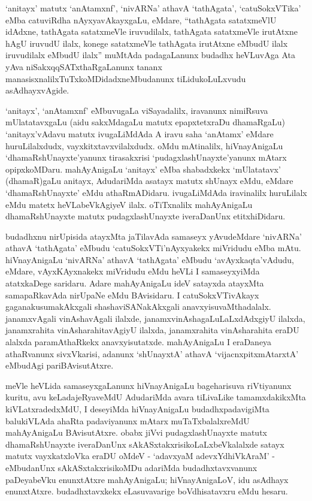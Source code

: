 `anitayx' matutx `anAtamxnf', `nivARNa' athavA `tathAgata', `catuSokxVTika' eMba catuviRdha nAyxyavAkayxgaLu, eMdare, ``tathAgata satatxmeVlU idAdxne, tathAgata satatxmeVle iruvudilalx, tathAgata satatxmeVle irutAtxne hAgU iruvudU ilalx, konege satatxmeVle tathAgata irutAtxne eMbudU ilalx iruvudilalx eMbudU ilalx'' muMtAda padagaLanunx budadhx heVLuvAga Ata yAva niSakxqqSATxthaRgaLanunx tananx manasisxnalilxTuTxkoMDidadxneMbudanunx tiLidukoLuLxvudu asAdhayxvAgide.

`anitayx', `anAtamxnf' eMbuvugaLa viSayadalilx, iravanunx nimiRsuva mUlatatavx\-gaLu (aidu sakxMdagaLu matutx epapxtetxraDu dhamaRgaLu) `anitayx'vAdavu matutx ivugaLiMdAda A iravu saha `anAtamx' eMdare huruLilalxdudx, vayxkitxtavxvilalxdudx. oMdu mAtinalilx, hiVnayAnigaLu `dhamaRshUnayxte'yanunx tirasakxrisi `pudagxlashUnayxte'yanunx mAtarx opipxkoMDaru. mahAyAnigaLu `anitayx' eMba shabadxkekx `mUlatatavx' (dhamaR)gaLu anitayx, AdudariMda asatayx matutx shUnayx eMdu, eMdare `dhamaRshUnayxte' eMdu athaRmADidaru. ivugaLiMdAda iravinalilx huruLilalx eMdu matetx heVLabeVkAgiyeV ilalx. oTiTxnalilx mahAyAnigaLu dhamaRshUnayxte matutx pudagxlashUnayxte iveraDanUnx etitxhiDidaru.

budadhxnu nirUpisida atayxMta jaTilavAda samaseyx yAvudeMdare `nivARNa' athavA `tathAgata' eMbudu `catuSokxVTi'nAyxyakekx miVridudu eMba mAtu. hiVnayAnigaLu `nivARNa' athavA `tathAgata' eMbudu `avAyxkaqta'vAdudu, eMdare, vAyxKAyxnakekx miVridudu eMdu heVLi I samaseyxyiMda atatxkaDege saridaru. Adare mahAyAnigaLu ideV satayxda atayxMta samapaRkavAda nirUpaNe eMdu BAvisidaru. I catuSokxVTivAkayx gaganakusumakAkxgali shashaviSANakAkxgali anavxyisuvaMthadalalx. janamxvAgali vinAshavAgali ilalxde, janamxvinAshagaLuLaLxdAdxgiyU ilalxda, janamxrahita vinAsharahitavAgiyU ilalxda, janamxrahita vinAsharahita eraDU alalxda paramAthaRkekx anavxyisutatxde. mahAyAnigaLu I eraDaneya athaRvanunx sivxVkarisi, adanunx `shUnayxtA' athavA `vijacnxpitxmAtarxtA' eMbudAgi pariBAvisutAtxre.

meVle heVLida samaseyxgaLanunx hiVnayAnigaLu bageharisuva riVtiyanunx kuritu, avu keLadajeRyaveMdU AdudariMda avara tiLivaLike tamamxdakikxMta kiVLatxradedxMdU, I deseyiMda hiVnayAnigaLu budadhxpadavigiMta balukiVLAda ahaRta padaviyanunx mAtarx muTaTxbalalxreMdU mahAyAnigaLu BAvisutAtxre. obabx jiVvi pudagxlashUnayxte matutx dhamaRshUnayxte iveraDanUnx sAkASxtakxrisikoLaLxbeVkalalxde satayx matutx vayxkatxloVka eraDU oMdeV - `adavxyaM adevxYdhiVkAraM' - eMbudanUnx sAkASxtakxrisikoMDu adariMda budadhxtavxvanunx paDeyabeVku enunxtAtxre mahAyAnigaLu; hiVnayAnigaLoV, idu asAdhayx enunxtAtxre. budadhxtavxkekx eLasuvavarige boVdhisatavxru eMdu hesaru.

